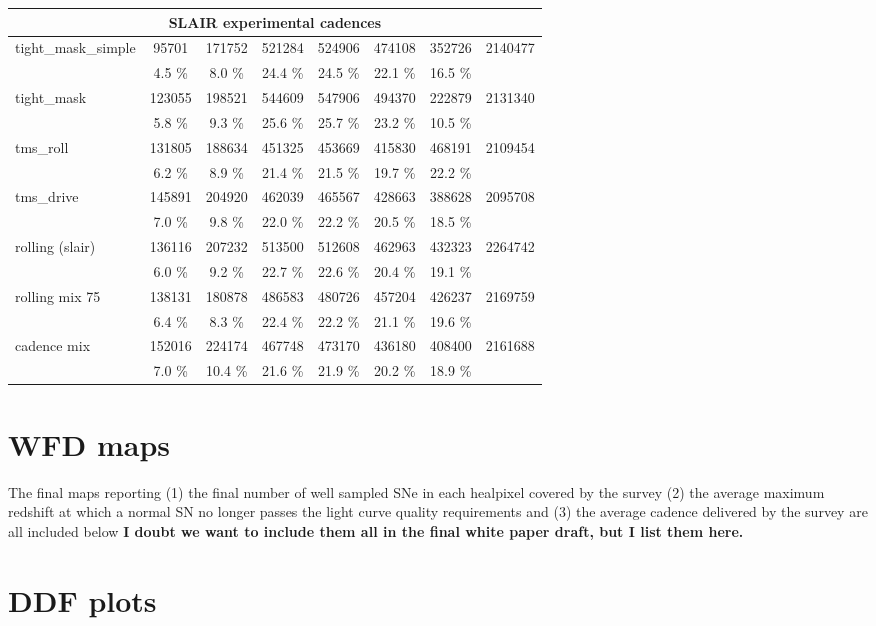 \documentclass [11pt,a4paper]{article}
\newcommand{\FixMe}[1]{{\color{red} \bf \large #1}}
\begin{document}
\begin{appendices}
\begin{longtable}{l|ccccccc}
\hline
\hline       
\multicolumn{8}{c}{SLAIR experimental cadences}\\
\hline
   tight\_mask\_simple &   95701 &  171752 &  521284 &  524906 &  474108 &  352726 &  2140477 \\ 
                     &    4.5 \% &    8.0 \% &   24.4 \% &   24.5 \% &   22.1 \% &   16.5 \% & \\
\hline
          tight\_mask &  123055 &  198521 &  544609 &  547906 &  494370 &  222879 &  2131340 \\ 
                     &    5.8 \% &    9.3 \% &   25.6 \% &   25.7 \% &   23.2 \% &   10.5 \% & \\
\hline
            tms\_roll &  131805 &  188634 &  451325 &  453669 &  415830 &  468191 &  2109454 \\ 
                     &    6.2 \% &    8.9 \% &   21.4 \% &   21.5 \% &   19.7 \% &   22.2 \% & \\
\hline
           tms\_drive &  145891 &  204920 &  462039 &  465567 &  428663 &  388628 &  2095708 \\ 
                     &    7.0 \% &    9.8 \% &   22.0 \% &   22.2 \% &   20.5 \% &   18.5 \% & \\
\hline
     rolling (slair) &  136116 &  207232 &  513500 &  512608 &  462963 &  432323 &  2264742 \\ 
                     &    6.0 \% &    9.2 \% &   22.7 \% &   22.6 \% &   20.4 \% &   19.1 \% & \\
\hline
      rolling mix 75 &  138131 &  180878 &  486583 &  480726 &  457204 &  426237 &  2169759 \\ 
                     &    6.4 \% &    8.3 \% &   22.4 \% &   22.2 \% &   21.1 \% &   19.6 \% & \\
\hline
         cadence mix &  152016 &  224174 &  467748 &  473170 &  436180 &  408400 &  2161688 \\ 
                     &    7.0 \% &   10.4 \% &   21.6 \% &   21.9 \% &   20.2 \% &   18.9 \% & \\
\hline

      
    \end{longtable}
  
  \section{WFD maps}
  The final maps reporting (1) the final number of well sampled SNe in
  each healpixel covered by the survey (2) the average maximum
  redshift at which a normal SN no longer passes the light curve
  quality requirements and (3) the average cadence delivered by the
  survey are all included below \FixMe{I doubt we want to include them
    all in the final white paper draft, but I list them here.}
  
  
    
  \section{DDF plots}

  

\end{appendices}
\end{document}
